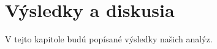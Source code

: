 \chapter{Výsledky a diskusia}
V tejto kapitole budú popísané výsledky našich analýz.
\label{kap:vysl}
